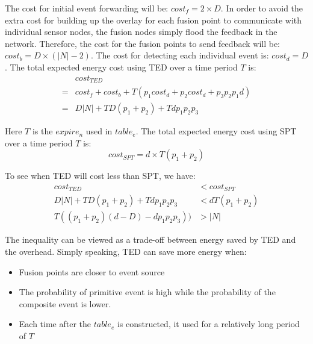 The cost for initial event forwarding will be: \(cost_f=2\times D\). In order to avoid the extra cost for building up the overlay for each fusion point to communicate with individual sensor nodes, the fusion nodes simply flood the feedback in the network. Therefore, the cost for the fusion points to send feedback will be: \(cost_b=D\times(|N|-2)\). The cost for detecting each individual event is: \(cost_d=D\). The total expected energy cost using TED over a time period \(T\) is:
\begin{align*}
&cost_{TED}\\
=&cost_f+cost_b+T(p_1cost_d+p_2cost_d+p_3p_2p_1d)\\
=&D|N|+TD(p_1+p_2)+Tdp_1p_2p_3
\end{align*}

Here \(T\) is the \(expire_n\) used in \(table_e\). The total expected energy cost using SPT over a time period \(T\) is:
\begin{equation*}
cost_{SPT}=d\times T(p_1+p_2)
\end{equation*}

To see when TED will cost less than SPT, we have:
\begin{align*}
cost_{TED}&<cost_{SPT}\\
D|N|+TD(p_1+p_2)+Tdp_1p_2p_3&<dT(p_1+p_2)\\
T((p_1+p_2)(d-D)-dp_1p_2p_3))&>|N|
\end{align*}

The inequality can be viewed as a trade-off between energy saved by TED and the overhead. Simply speaking, TED can save more energy when:
\begin{itemize}
\item Fusion points are closer to event source
\item The probability of primitive event is high while the probability of the composite event is lower.
\item Each time after the \(table_e\) is constructed, it used for a relatively long period of \(T\) 
\end{itemize}
